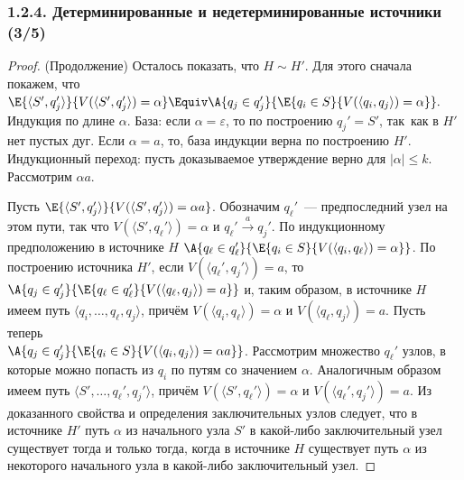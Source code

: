 \begin{frame}
\frametitle{1.2.4. Детерминированные и недетерминированные источники (3/5)}
\begin{proof} (Продолжение)
Осталось показать, что $H\sim H'$. Для этого сначала покажем, что
$
\E{\langle S', q_j'\rangle}
{V(\langle S', q_j'\rangle) = \alpha}
\Equiv
\A{q_j\in q_j'}
{\E{q_i\in S}
{V(\langle q_i, q_j \rangle)=\alpha}}.
$
Индукция по длине $\alpha$. База: если
$\alpha=\varepsilon$, то по построению $q_j' = S'$, так~как в $H'$
нет пустых дуг. Если $\alpha=a$,
то, база индукции верна по построению $H'$.
Индукционный переход: пусть
доказываемое утверждение верно для $|\alpha|\leq k$. Рассмотрим
$\alpha a$.

Пусть $\E{\langle S', q_j'\rangle}
{V(\langle S', q_j'\rangle)= \alpha a}$.
Обозначим
$q_\ell'$~--- предпоследний узел на этом пути, так что
$V(\langle S', q_\ell'\rangle)= \alpha$ и
$q_\ell'\stackrel{a}\longrightarrow q_j'$.
По индукционному предположению в источнике $H$
$\A{q_\ell\in q_\ell'}{\E{q_i\in S}{V(\langle q_i, q_\ell \rangle)=\alpha}}$.
По построению источника $H'$, если
$V(\langle q_\ell', q_j'\rangle) =a$, то
$\A{q_j\in q_j'}{\E{q_\ell\in q_\ell'}{V(\langle q_\ell, q_j\rangle)=a}}$ и, таким
образом, в источнике $H$ имеем путь $\langle q_i,\dots, q_\ell,
q_j\rangle$, причём $V(\langle q_i, q_\ell\rangle)=\alpha$ и
$V(\langle q_\ell, q_j\rangle)=a$.
Пусть теперь \\$\A{q_j\in q_j'}
{\E{q_i\in S}
{V(\langle q_i, q_j \rangle)=\alpha a}}$. Рассмотрим
множество $q_\ell'$ узлов, в которые можно попасть из $q_i$ по путям
со значением $\alpha$. Аналогичным образом имеем путь
$\langle S',\dots, q_\ell', q_j'\rangle$, причём
$V(\langle S',q_\ell'\rangle)=\alpha$ и $V(\langle q_\ell', q_j'\rangle)=a$.
Из доказанного свойства и определения заключительных узлов следует, что в источнике $H'$ путь $\alpha$  из начального узла $S'$ в какой-либо
заключительный узел существует тогда и только тогда, когда в источнике $H$ существует
путь $\alpha$ из некоторого начального узла в какой-либо
заключительный узел.
\end{proof}
\end{frame}


